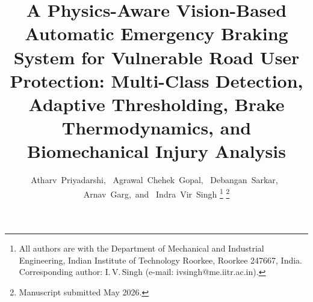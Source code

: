 \documentclass[journal]{IEEEtran}
\begin{document}

\title{A Physics-Aware Vision-Based Automatic Emergency Braking System
       for Vulnerable Road User Protection:
       Multi-Class Detection, Adaptive Thresholding,
       Brake Thermodynamics, and Biomechanical Injury Analysis}

\author{Atharv~Priyadarshi,~
        Agrawal~Chehek~Gopal,~
        Debangan~Sarkar,~
        Arnav~Garg,~and~
        Indra~Vir~Singh%
\thanks{All authors are with the Department of Mechanical and Industrial
Engineering, Indian Institute of Technology Roorkee, Roorkee 247667,
India. Corresponding author: I.\,V.\,Singh
(e-mail: ivsingh@me.iitr.ac.in).}%
\thanks{Manuscript submitted May 2026.}}

\maketitle
\end{document}
